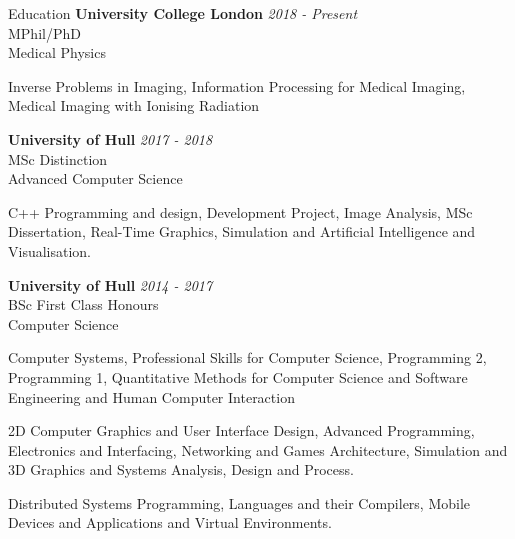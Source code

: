 \documentclass{cv}
\begin{document}
\begin{rSection}{Education}
{\bf University College London} \hfill {\em 2018 - Present} 
\\ MPhil/PhD
\\ Medical Physics
\item Inverse Problems in Imaging, Information Processing for Medical Imaging, Medical Imaging with Ionising Radiation

{\bf University of Hull} \hfill {\em 2017 - 2018} 
\\ MSc \hfill {Distinction}
\\ Advanced Computer Science
\item C++ Programming and design, Development Project, Image Analysis, MSc Dissertation, Real-Time Graphics, Simulation and Artificial Intelligence and Visualisation.

{\bf University of Hull} \hfill {\em 2014 - 2017} 
\\ BSc \hfill {First Class Honours}
\\ Computer Science
\item Computer Systems, Professional Skills for Computer Science, Programming 2, Programming 1, Quantitative Methods for Computer Science and Software Engineering and Human Computer Interaction

\item 2D Computer Graphics and User Interface Design, Advanced Programming, Electronics and Interfacing, Networking and Games Architecture, Simulation and 3D Graphics and Systems Analysis, Design and Process.

\item Distributed Systems Programming, Languages and their Compilers, Mobile Devices and Applications and Virtual Environments.
\end{rSection}
\end{document}
